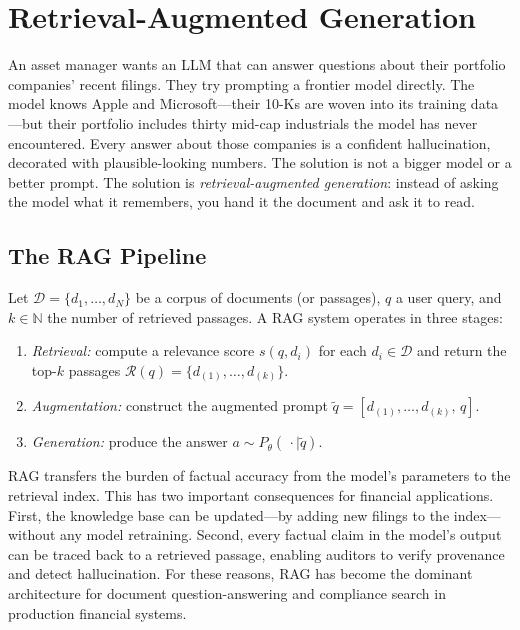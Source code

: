 \section{Retrieval-Augmented Generation}
\label{sec:rag}

\begin{context}

An asset manager wants an LLM that can answer questions about their portfolio
companies' recent filings.  They try prompting a frontier model directly.  The
model knows Apple and Microsoft---their 10-Ks are woven into its training
data---but their portfolio includes thirty mid-cap industrials the model has
never encountered.  Every answer about those companies is a confident
hallucination, decorated with plausible-looking numbers.  The solution is not a
bigger model or a better prompt.  The solution is \emph{retrieval-augmented
generation}: instead of asking the model what it remembers, you hand it the
document and ask it to read.

\subsection{The RAG Pipeline}
\label{sec:rag-pipeline}

\begin{definition}
\label{def:rag}
Let $\mathcal{D} = \{d_1,\ldots,d_N\}$ be a corpus of documents (or passages),
$q$ a user query, and $k \in \mathbb{N}$ the number of retrieved passages.
A RAG system operates in three stages:
\begin{enumerate}
  \item \emph{Retrieval:} compute a relevance score $s(q, d_i)$ for each
        $d_i \in \mathcal{D}$ and return the top-$k$ passages
        $\mathcal{R}(q) = \{d_{(1)},\ldots,d_{(k)}\}$.
  \item \emph{Augmentation:} construct the augmented prompt
        $\tilde{q} = [d_{(1)},\ldots,d_{(k)},\, q]$.
  \item \emph{Generation:} produce the answer $a \sim P_\theta(\,\cdot \mid \tilde{q})$.
\end{enumerate}
\end{definition}

RAG transfers the burden of factual accuracy from the model's parameters to the
retrieval index.  This has two important consequences for financial applications.
First, the knowledge base can be updated---by adding new filings to the index---without
any model retraining.  Second, every factual claim in the model's output can be
traced back to a retrieved passage, enabling auditors to verify provenance and detect
hallucination.  For these reasons, RAG has become the dominant architecture for
document question-answering and compliance search in production financial systems.


\end{context}
